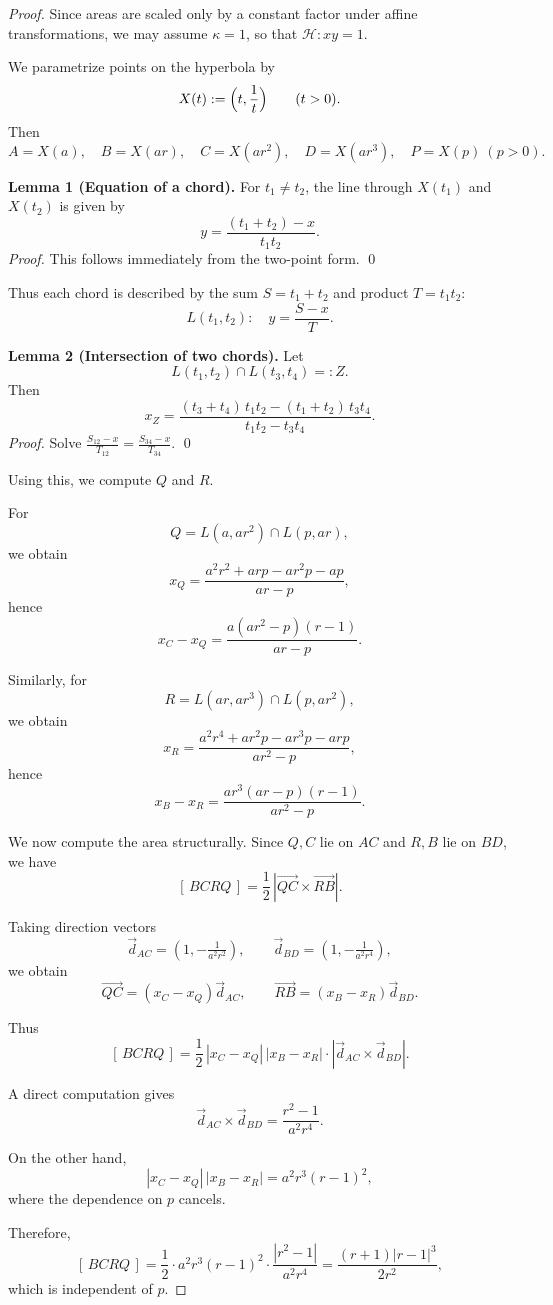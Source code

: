 \documentclass[10pt,a4paper]{amsart}
\begin{document}
\begin{proof}
Since areas are scaled only by a constant factor under affine transformations,
we may assume $\kappa=1$, so that $\mathcal H:xy=1$.

We parametrize points on the hyperbola by
\[
X(t):=\Bigl(t,\frac{1}{t}\Bigr)\qquad (t>0).
\]
Then
\[
A=X(a),\quad B=X(ar),\quad C=X(ar^2),\quad D=X(ar^3),\quad P=X(p)\ (p>0).
\]

\medskip
\noindent
\textbf{Lemma 1 (Equation of a chord).}
For $t_1\neq t_2$, the line through $X(t_1)$ and $X(t_2)$ is given by
\[
y=\frac{(t_1+t_2)-x}{t_1t_2}.
\]
\emph{Proof.} This follows immediately from the two-point form. \qed

\medskip
Thus each chord is described by the sum $S=t_1+t_2$ and product $T=t_1t_2$:
\[
L(t_1,t_2):\quad y=\frac{S-x}{T}.
\]

\medskip
\noindent
\textbf{Lemma 2 (Intersection of two chords).}
Let
\[
L(t_1,t_2)\cap L(t_3,t_4)=:Z.
\]
Then
\[
x_Z=\frac{(t_3+t_4)\,t_1t_2-(t_1+t_2)\,t_3t_4}{t_1t_2-t_3t_4}.
\]
\emph{Proof.} Solve $\frac{S_{12}-x}{T_{12}}=\frac{S_{34}-x}{T_{34}}$. \qed

\medskip
Using this, we compute $Q$ and $R$.

For
\[
Q=L(a,ar^2)\cap L(p,ar),
\]
we obtain
\[
x_Q=\frac{a^2r^2+arp-ar^2p-ap}{ar-p},
\]
hence
\[
x_C-x_Q=\frac{a(ar^2-p)(r-1)}{ar-p}.
\]

Similarly, for
\[
R=L(ar,ar^3)\cap L(p,ar^2),
\]
we obtain
\[
x_R=\frac{a^2r^4+ar^2p-ar^3p-arp}{ar^2-p},
\]
hence
\[
x_B-x_R=\frac{a r^3(ar-p)(r-1)}{ar^2-p}.
\]

\medskip
We now compute the area structurally.
Since $Q,C$ lie on $AC$ and $R,B$ lie on $BD$,
we have
\[
[\,BCRQ\,]=\frac{1}{2}\,|\overrightarrow{QC}\times\overrightarrow{RB}|.
\]

Taking direction vectors
\[
\vec d_{AC}=(1,-\tfrac{1}{a^2r^2}),\qquad
\vec d_{BD}=(1,-\tfrac{1}{a^2r^4}),
\]
we obtain
\[
\overrightarrow{QC}=(x_C-x_Q)\vec d_{AC},\qquad
\overrightarrow{RB}=(x_B-x_R)\vec d_{BD}.
\]

Thus
\[
[\,BCRQ\,]
=
\frac{1}{2}\,|x_C-x_Q|\,|x_B-x_R|\cdot|\vec d_{AC}\times\vec d_{BD}|.
\]

A direct computation gives
\[
\vec d_{AC}\times\vec d_{BD}
=
\frac{r^2-1}{a^2r^4}.
\]

On the other hand,
\[
|x_C-x_Q|\,|x_B-x_R|
=
a^2r^3(r-1)^2,
\]
where the dependence on $p$ cancels.

Therefore,
\[
[\,BCRQ\,]
=
\frac12\cdot a^2r^3(r-1)^2\cdot \frac{|r^2-1|}{a^2r^4}
=
\frac{(r+1)|r-1|^3}{2r^2},
\]
which is independent of $p$.
\end{proof}
\end{document}
